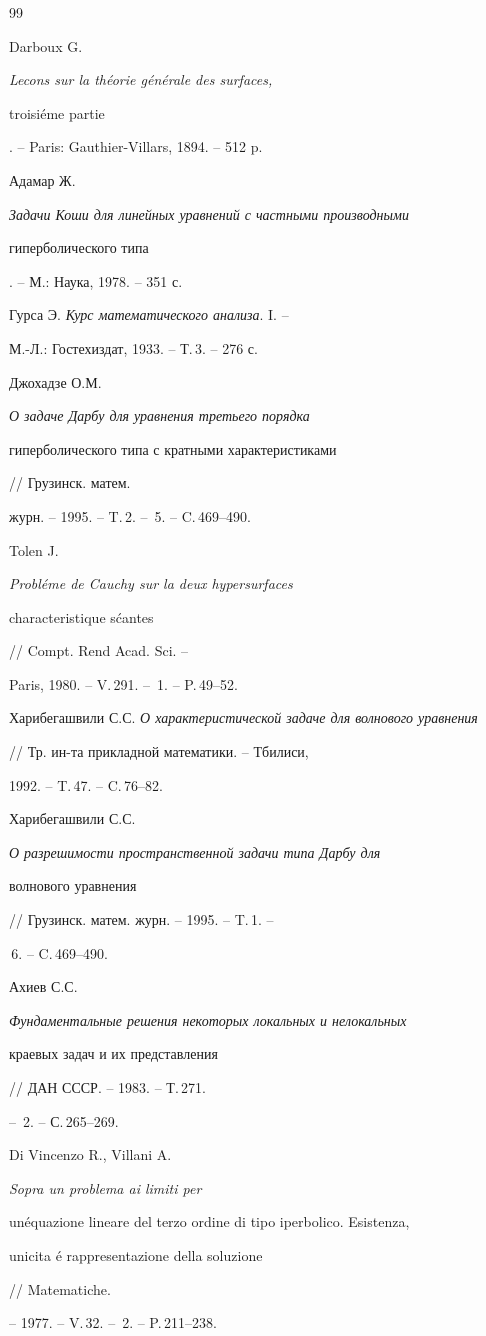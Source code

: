 \begin{thebibliography}{99}







Darboux G. {\em Lecons sur la th\'eorie g\'en\'erale des surfaces,


troisi\'eme partie}. -- Paris: Gauthier-Villars, 1894. -- 512 p.




Адамар Ж. {\em Задачи Коши для линейных уравнений с частными производными


гиперболического типа}. -- М.: Наука, 1978. -- 351 с.




Гурса Э. {\em Курс математического анализа}. I. --


М.-Л.: Гостехиздат, 1933. -- Т.\,3. -- 276 с.




Джохадзе О.М. {\em О задаче Дарбу для уравнения третьего порядка


гиперболического типа с кратными характеристиками} // Грузинск. матем.


журн. -- 1995. -- T.\,2. -- \No\,5. -- C.\,469--490.




Tolen J. {\em Probl\'eme de Cauchy sur la deux hypersurfaces


characteristique s\'cantes} // Compt. Rend Acad. Sci. --


Paris, 1980. -- V.\,291. -- \No\,1. -- P.\,49--52.




Харибегашвили С.С. {\em О характеристической задаче для волнового уравнения}


// Тр. ин-та прикладной математики. -- Тбилиси,


1992. -- T.\,47. -- C.\,76--82.




Харибегашвили С.С. {\em О разрешимости пространственной задачи типа Дарбу для


волнового уравнения} // Грузинск. матем. журн. -- 1995. -- T.\,1. --


\No\,6. -- C.\,469--490.




Ахиев С.С. {\em Фундаментальные решения некоторых локальных и нелокальных


краевых задач и их представления} // ДАН СССР. -- 1983. -- Т.\,271.


-- \No\,2. -- С.\,265--269.




Di Vincenzo R., Villani A. {\em Sopra un problema ai limiti per


un\'equazione lineare del terzo ordine di tipo iperbolico. Esistenza,


unicita \'e rappresentazione della soluzione} // Matematiche.


-- 1977. -- V.\,32. -- \No\,2. -- P.\,211--238.





\end{thebibliography}
